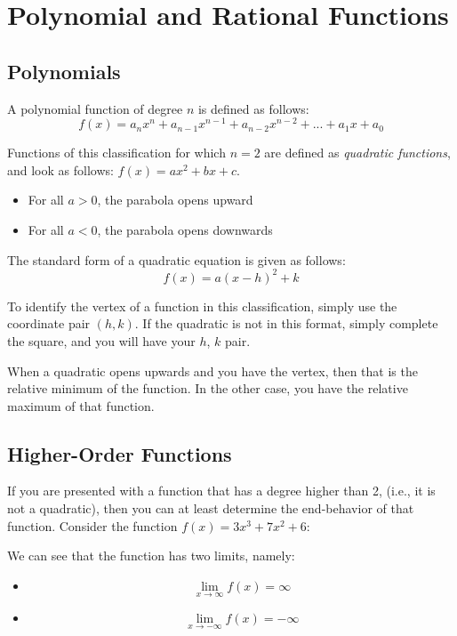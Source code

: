 \chapter{Polynomial and Rational Functions}
\section{Polynomials}
A polynomial function of degree $n$ is defined as follows:
\begin{equation}
  f(x)=a_nx^n+a_{n-1}x^{n-1}+a_{n-2}x^{n-2}+...+a_1x+a_0
\end{equation}

Functions of this classification for which $n=2$ are defined as
\textit{quadratic functions}, and look as follows: $f(x)=ax^2+bx+c$.

\begin{itemize}
  \item For all $a>0$, the parabola opens upward
  \item For all $a<0$, the parabola opens downwards
\end{itemize}

The standard form of a quadratic equation is given as follows:
\begin{equation}
  f(x)=a(x-h)^2+k
\end{equation}

To identify the vertex of a function in this classification, simply use the
coordinate pair $(h,k)$.  If the quadratic is not in this format, simply
complete the square, and you will have your $h$, $k$ pair.

When a quadratic opens upwards and you have the vertex, then that is the
relative minimum of the function.  In the other case, you have the relative
maximum of that function.

\section{Higher-Order Functions}
If you are presented with a function that has a degree higher than 2, (i.e., it
is not a quadratic), then you can at least determine the end-behavior of that
function.  Consider the function $f(x)=3x^3+7x^2+6$:


We can see that the function has two limits, namely:
\begin{itemize}
  \item $$\lim_{x\to\infty} f(x)=\infty$$
  \item $$\lim_{x\to-\infty} f(x)=-\infty$$
\end{itemize}

